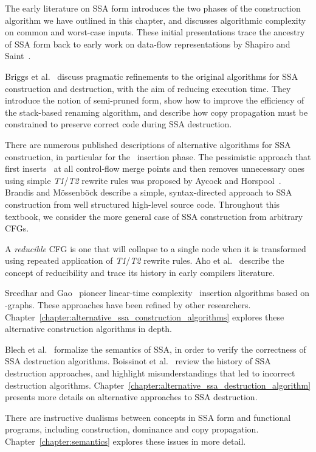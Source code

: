 {The early literature on SSA form
\cite{cytron89efficient,cytron91efficiently}
introduces the two phases of the construction algorithm
we have outlined in this chapter,
and discusses algorithmic complexity on common and worst-case inputs.
These initial presentations trace the ancestry of SSA form back to
early work on data-flow representations by Shapiro and Saint~\cite{shapiro69representation}.

Briggs et al.~\cite{briggs98practical} discuss pragmatic
refinements to the original algorithms for SSA construction
and destruction, with the aim of reducing execution time.
They introduce the notion of semi-pruned form, %
show how to improve the efficiency of the stack-based renaming
algorithm,
and describe how copy propagation must be constrained to
preserve correct code during SSA destruction.

There are numerous published descriptions of alternative algorithms
for SSA construction, in particular for the \phifun\ insertion phase.
The pessimistic approach that first inserts \phifuns\ at all control-flow merge points and then removes unnecessary ones using simple
\emph{T1}/\emph{T2}
rewrite rules was proposed by Aycock
and Horspool~\cite{aycock00simple}. 
Brandis and M\"{o}ssenb\"{o}ck 
\cite{brandis94single}
describe a 
simple, syntax-directed approach to SSA construction from 
well structured high-level source code.
Throughout this textbook, we consider the more
general case of SSA construction from arbitrary CFGs.

A \textit{reducible} CFG is one that will collapse to a single node when 
it is transformed using repeated application of \emph{T1}/\emph{T2}
rewrite rules.
Aho et al.~\cite{aho86compilers} describe the concept of reducibility
and trace its history in early compilers literature.

Sreedhar and Gao~\cite{sreedhar95linear} pioneer
linear-time complexity 
\phifun\ insertion
algorithms based on \DJ-graphs.
These approaches have been refined by other researchers.
Chapter~\ref{chapter:alternative_ssa_construction_algorithms}
explores these alternative construction algorithms in depth.


Blech et al.~\cite{blech05optimizing}
formalize the semantics of SSA, in order to verify
the correctness of SSA destruction algorithms.
Boissinot et al.~\cite{boissinot09revisiting} review the history of SSA destruction approaches,
and highlight misunderstandings that led to incorrect destruction
algorithms.
Chapter~\ref{chapter:alternative_ssa_destruction_algorithm} presents
more details on alternative approaches to SSA destruction.

There are instructive dualisms between concepts in SSA form
and
functional programs, including construction, dominance and
copy propagation. Chapter~\ref{chapter:semantics} explores these issues
in more detail.


}

